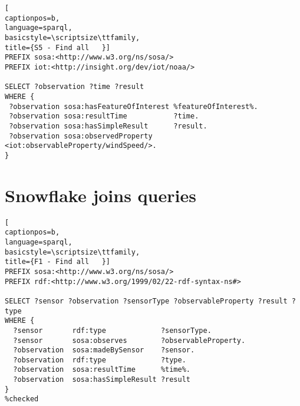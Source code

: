 \begin{lstlisting}[
captionpos=b, 
language=sparql,
basicstyle=\scriptsize\ttfamily,
title={S5 - Find all   }]
PREFIX sosa:<http://www.w3.org/ns/sosa/>
PREFIX iot:<http://insight.org/dev/iot/noaa/>

SELECT ?observation ?time ?result 
WHERE {
 ?observation sosa:hasFeatureOfInterest %featureOfInterest%.
 ?observation sosa:resultTime	        ?time.
 ?observation sosa:hasSimpleResult      ?result.
 ?observation sosa:observedProperty     <iot:observableProperty/windSpeed/>.
}
\end{lstlisting}
\section{Snowflake joins queries}

\begin{lstlisting}[
captionpos=b, 
language=sparql,
basicstyle=\scriptsize\ttfamily,
title={F1 - Find all   }]
PREFIX sosa:<http://www.w3.org/ns/sosa/>
PREFIX rdf:<http://www.w3.org/1999/02/22-rdf-syntax-ns#>

SELECT ?sensor ?observation ?sensorType ?observableProperty ?result ?type
WHERE {
  ?sensor       rdf:type             ?sensorType.
  ?sensor       sosa:observes        ?observableProperty.
  ?observation  sosa:madeBySensor    ?sensor.
  ?observation  rdf:type             ?type.
  ?observation  sosa:resultTime      %time%.
  ?observation  sosa:hasSimpleResult ?result
}
%checked
\end{lstlisting}



